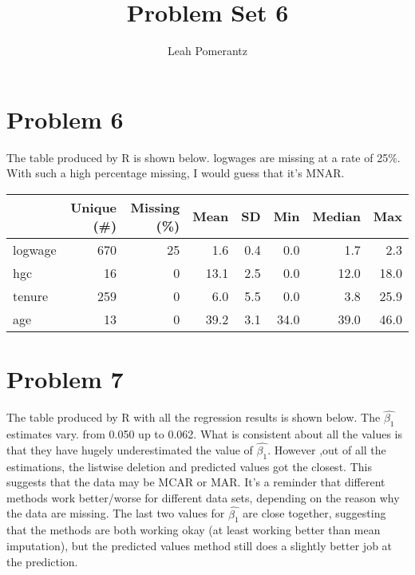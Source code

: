 \documentclass{article}
\title{Problem Set 6}
\author{Leah Pomerantz}
\begin{document}
\maketitle


\section{Problem 6}

The table produced by R is shown below. logwages are missing at a rate of 25\%. With such a high percentage missing, I would guess that it's MNAR. 

\begin{table}
    \centering
    \begin{tabular}[t]{lrrrrrrr}
        \toprule
        & Unique (\#) & Missing (\%) & Mean & SD & Min & Median & Max\\
        \midrule
        logwage & 670 & 25 & \num{1.6} & \num{0.4} & \num{0.0} & \num{1.7} & \num{2.3}\\
        hgc & 16 & 0 & \num{13.1} & \num{2.5} & \num{0.0} & \num{12.0} & \num{18.0}\\
        tenure & 259 & 0 & \num{6.0} & \num{5.5} & \num{0.0} & \num{3.8} & \num{25.9}\\
        age & 13 & 0 & \num{39.2} & \num{3.1} & \num{34.0} & \num{39.0} & \num{46.0}\\
        \bottomrule
    \end{tabular}
\end{table}

\section{Problem 7}

The table produced by R with all the regression results is shown below. The $\hat{\beta_1}$ estimates vary. from 0.050 up to 0.062. What is consistent about all the values is that they have hugely underestimated the value of $\hat{\beta_1}$. However ,out of all the estimations, the listwise deletion and predicted values got the closest. This suggests that the data may be MCAR or MAR. It's a reminder that different methods work better/worse for different data sets, depending on the reason why the data are missing. The last two values for $\hat{\beta_1}$ are close together, suggesting that the methods are both working okay (at least working better than mean imputation), but the predicted values method still does a slightly better job at the prediction.
\end{document}
